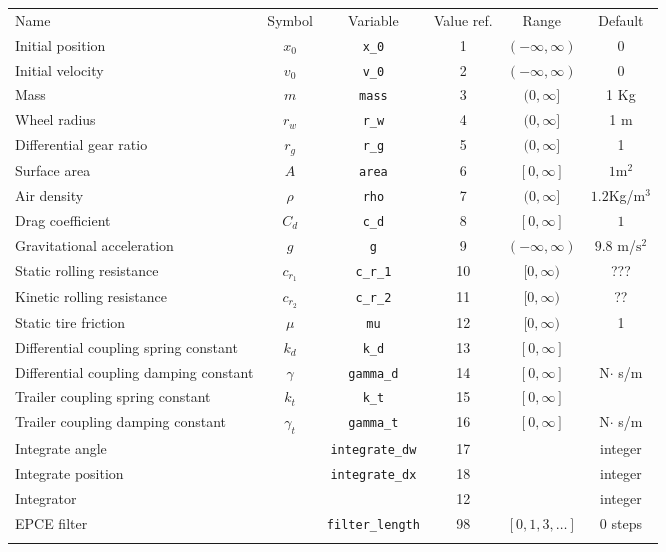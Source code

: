 \documentclass[10pt,notitlepage,abstracton]{scrartcl}
\theoremstyle{plain}
\theoremstyle{plain}
\theoremstyle{plain}
\begin{document}
\begin{tabularx}{1.0\linewidth}[H]{ ||X|c|c|c|c|c|| }
  \hhline{|======|}
  Name & Symbol & Variable & Value ref. & Range & Default \\
  \hhline{|======|}
  Initial position & $x_{0}$ & \texttt{x\_0} & 1  & $(-\infty,\infty)$ & 0 \\ \hline
  Initial velocity & $v_{0}$ & \texttt{v\_0} & 2  & $(-\infty,\infty)$ & 0 \\ \hline
  Mass  & $m$ & \texttt{mass}& 3 & $(0,\infty]$ & 1 Kg \\ \hline
  Wheel radius &$r_{w}$& \texttt{r\_w} & 4 &  $(0,\infty]$  &1 m \\ \hline
  Differential gear ratio & $r_{g}$ &\texttt{r\_g} & 5 & $(0,\infty]$ & 1 \\ \hline
  Surface area & $A$& \texttt{area} & 6  & $[0,\infty]$ & $1\text{m}^{2}$ \\ \hline
  Air density & $\rho$ & \texttt{rho} & 7 & $(0,\infty]$ & $1.2$Kg/$\text{m}^{3}$ \\ \hline
  Drag coefficient & $C_{d}$ & \texttt{c\_d} & 8 & $[0,\infty]$ & $1$ \\ \hline
  Gravitational \newline acceleration & $g$ &\texttt{g} & 9 & $(-\infty, \infty)$ & $9.8$ m/$\text{s}^{2}$ \\ \hline
  Static rolling \newline resistance & $c_{r_{1}}$ &\texttt{c\_r\_1} & 10 & $[0, \infty)$ & ???  \\ \hline
  Kinetic rolling \newline resistance & $c_{r_{2}}$ &\texttt{c\_r\_2} & 11 & $[0, \infty)$ & ??  \\ \hline
  Static tire 
  friction & $\mu$ & \texttt{mu} & 12 & $[0, \infty)$ & 1 \\ \hline
  Differential coupling spring constant & $k_{d}$ &\texttt{k\_d} & 13 & $[0,\infty]$ & \\ \hline
  Differential  coupling damping  constant & $\gamma$
                &\texttt{gamma\_d} & 14 & $[0,\infty]$ & N$\cdot$ s/m \\\hline 
  Trailer coupling spring  constant & $k_{t}$ &\texttt{k\_t} & 15 & $[0,\infty]$ & \\ \hline
  Trailer coupling damping  constant & $\gamma_{t}$
                &\texttt{gamma\_t} & 16 & $[0,\infty]$ & N$\cdot$ s/m \\\hline 
  Integrate angle &  & \texttt{\footnotesize{integrate\_dw}} & 17 &  & integer \\\hline
  Integrate position &  & \texttt{\footnotesize{integrate\_dx}} & 18 &  & integer \\\hline
  Integrator &  & & 12 &  & integer \\\hline
  EPCE filter &  & \texttt{\footnotesize{filter\_length}} & 98 & $[0,1,3,\ldots]$ & 0 steps \\ \hhline{|======|}
\end{tabularx}
\end{document}
